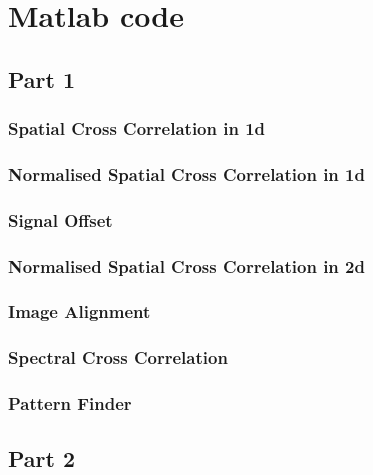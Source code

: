 \chapter{Matlab code}
\section{Part 1}
\subsection{Spatial Cross Correlation in 1d}
 \label{code:1.1_1}

\subsection{Normalised Spatial Cross Correlation in 1d}
 \label{code:1.1_2}

\subsection{Signal Offset}
 \label{code:1.2}

\subsection{Normalised Spatial Cross Correlation in 2d}
 \label{code:1.3}

\subsection{Image Alignment}
 \label{code:1.4}

\subsection{Spectral Cross Correlation}
 \label{code:1.5}

\subsection{Pattern Finder}
 \label{code:1.6}

\section{Part 2}
